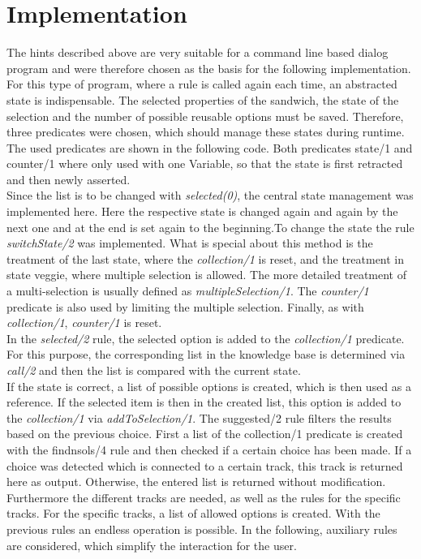 \documentclass{article}
\begin{document}
	\section{Implementation}
	The hints described above are very suitable for a command line based dialog program and were therefore chosen as the basis for the following implementation. For this type of program, where a rule is called again each time, an abstracted state is indispensable. The selected properties of the sandwich, the state of the selection and the number of possible reusable options must be saved. Therefore, three predicates were chosen, which should manage these states during runtime. The used predicates are shown in the following code. Both predicates state/1 and counter/1 where only used with one Variable, so that the state is first retracted and then newly asserted.\\
	Since the list is to be changed with \textit{selected(0)}, the central state management was implemented here. Here the respective state is changed again and again by the next one and at the end is set again to the beginning.To change the state the rule \textit{switchState/2} was implemented. What is special about this method is the treatment of the last state, where the \textit{collection/1} is reset, and the treatment in state veggie, where multiple selection is allowed. The more detailed treatment of a multi-selection is usually defined as \textit{multipleSelection/1}. The \textit{counter/1} predicate is also used by limiting the multiple selection. Finally, as with \textit{collection/1}, \textit{counter/1} is reset.\\
	In the \textit{selected/2} rule, the selected option is added to the \textit{collection/1} predicate. For this purpose, the corresponding list in the knowledge base is determined via \textit{call/2} and then the list is compared with  the current state. \\
	If the state is correct, a list of possible options is created, which is then used as a reference. If the selected item is then in the created list, this option is added to the \textit{collection/1} via \textit{addToSelection/1}. The suggested/2 rule filters the results based on the previous choice. First a list of the collection/1 predicate is created with the findnsols/4 rule and then checked if a certain choice has been made. If a choice was detected which is connected to a certain track, this track is returned here as output. Otherwise, the entered list is returned without modification. Furthermore the different tracks are needed, as well as the rules for the specific tracks. For the specific tracks, a list of allowed options is created. With the previous rules an endless operation is possible. In the following, auxiliary rules are considered, which simplify the interaction for the user.\\
\end{document}

